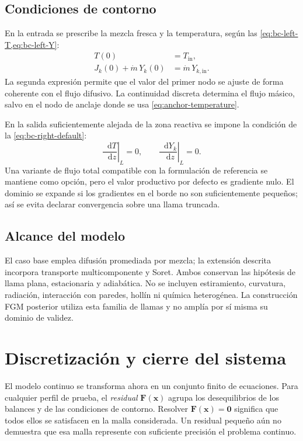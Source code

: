 \documentclass[12pt,a4paper,twoside,openany]{book}
\newcommand{\vect}[1]{\bm{#1}}
\newcommand{\dd}{\mathop{}\!\mathrm{d}}
\newcommand{\Tin}{T_{\mathrm{in}}}
\begin{document}
\subsection{Condiciones de contorno}

En la entrada se prescribe la mezcla fresca y la temperatura, según las \cref{eq:bc-left-T,eq:bc-left-Y}:
\begin{align}
  T(0)&=\Tin,\label{eq:bc-left-T}\\
  J_k(0)+\dot m\,Y_k(0)&=\dot m\,Y_{k,\mathrm{in}}.
  \label{eq:bc-left-Y}
\end{align}
La segunda expresión permite que el valor del primer nodo se ajuste de forma
coherente con el flujo difusivo. La continuidad discreta determina el flujo
másico, salvo en el nodo de anclaje donde se usa \cref{eq:anchor-temperature}.

En la salida suficientemente alejada de la zona reactiva se impone la condición de la \cref{eq:bc-right-default}:
\begin{equation}
  \left.\frac{\dd T}{\dd z}\right|_{L}=0,
  \qquad
  \left.\frac{\dd Y_k}{\dd z}\right|_{L}=0.
  \label{eq:bc-right-default}
\end{equation}
Una variante de flujo total compatible con la formulación de referencia se
mantiene como opción, pero el valor productivo por defecto es gradiente nulo. El
dominio se expande si los gradientes en el borde no son suficientemente pequeños;
así se evita declarar convergencia sobre una llama truncada.

\subsection{Alcance del modelo}

El caso base emplea difusión promediada por mezcla; la extensión descrita
incorpora transporte multicomponente y Soret. Ambos conservan las hipótesis de
llama plana, estacionaria y adiabática. No se incluyen estiramiento, curvatura,
radiación, interacción con paredes, hollín ni química heterogénea. La
construcción FGM posterior utiliza esta familia de llamas y no amplía por sí
misma su dominio de validez.

\section{Discretización y cierre del sistema}
\label{chap:numerico}

El modelo continuo se transforma ahora en un conjunto finito de ecuaciones.
Para cualquier perfil de prueba, el \emph{residual} \(\vect F(\vect x)\)
agrupa los desequilibrios de los balances y de las condiciones de contorno.
Resolver \(\vect F(\vect x)=\vect0\) significa que todos ellos se satisfacen
en la malla considerada. Un residual pequeño aún no demuestra que esa malla
represente con suficiente precisión el problema continuo.
\end{document}
